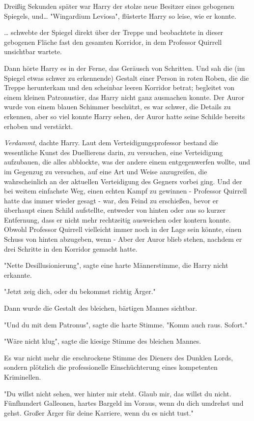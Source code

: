 {Dreißig Sekunden später war Harry der stolze neue Besitzer eines gebogenen Spiegels, und… "Wingardium Leviosa", flüsterte Harry so leise, wie er konnte.

… schwebte der Spiegel direkt über der Treppe und beobachtete in dieser gebogenen Fläche fast den gesamten Korridor, in dem Professor Quirrell unsichtbar wartete.

Dann hörte Harry es in der Ferne, das Geräusch von Schritten. Und sah die (im Spiegel etwas schwer zu erkennende) Gestalt einer Person in roten Roben, die die Treppe herunterkam und den scheinbar leeren Korridor betrat; begleitet von einem kleinen Patronustier, das Harry nicht ganz ausmachen konnte. Der Auror wurde von einem blauen Schimmer beschützt, es war schwer, die Details zu erkennen, aber so viel konnte Harry sehen, der Auror hatte seine Schilde bereits erhoben und verstärkt.

\emph{Verdammt}, dachte Harry. Laut dem Verteidigungsprofessor bestand die wesentliche Kunst des Duellierens darin, zu versuchen, eine Verteidigung aufzubauen, die alles abblockte, was der andere einem entgegenwerfen wollte, und im Gegenzug zu versuchen, auf eine Art und Weise anzugreifen, die wahrscheinlich an der aktuellen Verteidigung des Gegners vorbei ging. Und der bei weitem einfachste Weg, einen echten Kampf zu gewinnen - Professor Quirrell hatte das immer wieder gesagt - war, den Feind zu erschießen, bevor er überhaupt einen Schild aufstellte, entweder von hinten oder aus so kurzer Entfernung, dass er nicht mehr rechtzeitig ausweichen oder kontern konnte. Obwohl Professor Quirrell vielleicht immer noch in der Lage sein könnte, einen Schuss von hinten abzugeben, wenn - Aber der Auror blieb stehen, nachdem er drei Schritte in den Korridor gemacht hatte.

"Nette Desillusionierung", sagte eine harte Männerstimme, die Harry nicht erkannte.

"Jetzt zeig dich, oder du bekommst richtig Ärger."

Dann wurde die Gestalt des bleichen, bärtigen Mannes sichtbar.

"Und du mit dem Patronus", sagte die harte Stimme. "Komm auch raus. Sofort."

"Wäre nicht klug", sagte die kiesige Stimme des bleichen Mannes.

Es war nicht mehr die erschrockene Stimme des Dieners des Dunklen Lords, sondern plötzlich die professionelle Einschüchterung eines kompetenten Kriminellen.

"Du willst nicht sehen, wer hinter mir steht. Glaub mir, das willst du nicht. Fünfhundert Galleonen, hartes Bargeld im Voraus, wenn du dich umdrehst und gehst. Großer Ärger für deine Karriere, wenn du es nicht tust."

}
